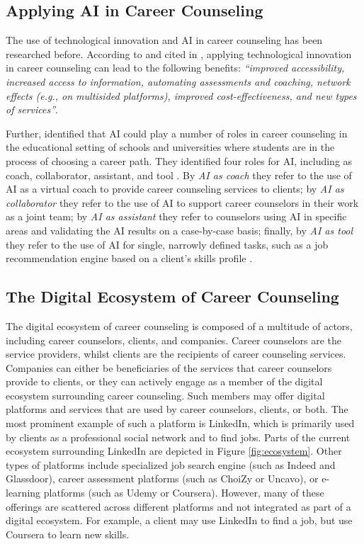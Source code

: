 \subsection{Applying AI in Career Counseling}

The use of technological innovation and AI in career counseling has been researched before. According to
\cite{westmanArtificialIntelligenceCareer2021} and cited in \cite{kaserAIpoweredCareerCounseling2023}, applying
technological innovation in career counseling can lead to the following benefits: \textit{``improved accessibility,
increased access to information, automating assessments and coaching, network effects (e.g., on multisided platforms),
improved cost-effectiveness, and new types of services''}.

Further, \cite{westmanArtificialIntelligenceCareer2021} identified that AI could play a number of roles in career
counseling in the educational setting of schools and universities where students are in the process of choosing a career
path. They identified four roles for AI, including as coach, collaborator, assistant, and tool \citep{westmanArtificialIntelligenceCareer2021}.
By \textit{AI as coach} they refer to the use of AI as a virtual coach to provide career counseling services to clients; by
\textit{AI as collaborator} they refer to the use of AI to support career counselors in their work as a joint team; by
\textit{AI as assistant} they refer to counselors using AI in specific areas and validating the AI results on a case-by-case
basis; finally, by \textit{AI as tool} they refer to the use of AI for single, narrowly defined tasks, such as a job recommendation
engine based on a client's skills profile \citep{westmanArtificialIntelligenceCareer2021}.

\subsection{The Digital Ecosystem of Career Counseling}

The digital ecosystem of career counseling is composed of a multitude of actors, including career counselors, clients,
and companies. Career counselors are the service providers, whilst clients are the recipients of career counseling services.
Companies can either be beneficiaries of the services that career counselors provide to clients, or they can actively engage
as a member of the digital ecosystem surrounding career counseling. Such members may offer digital platforms and services
that are used by career counselors, clients, or both. The most prominent example of such a platform is LinkedIn, which
is primarily used by clients as a professional social network and to find jobs. Parts of the current ecosystem surrounding
LinkedIn are depicted in Figure \ref{fig:ecosystem}. Other types of platforms include specialized job search engine  (such as
Indeed and Glassdoor), career assessment platforms (such as ChoiZy or Uncavo), or e-learning platforms (such as Udemy or Coursera).
However, many of these offerings are scattered across different platforms and not integrated as part of a digital ecosystem. For
example, a client may use LinkedIn to find a job, but use Coursera to learn new skills.

